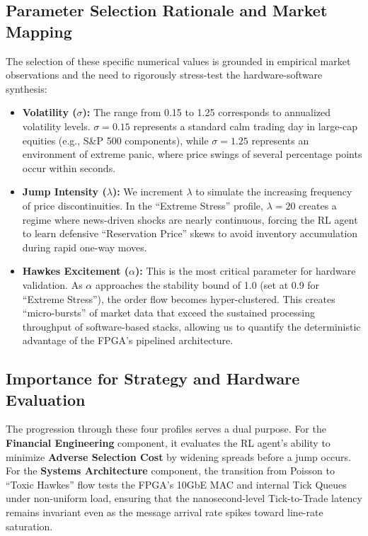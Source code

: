 \subsection{Parameter Selection Rationale and Market Mapping}
The selection of these specific numerical values is grounded in empirical market observations and the need to rigorously stress-test the hardware-software synthesis:

\begin{itemize}
    \item \textbf{Volatility ($\sigma$):} The range from 0.15 to 1.25 corresponds to annualized volatility levels. $\sigma=0.15$ represents a standard calm trading day in large-cap equities (e.g., S\&P 500 components), while $\sigma=1.25$ represents an environment of extreme panic, where price swings of several percentage points occur within seconds.
    \item \textbf{Jump Intensity ($\lambda$):} We increment $\lambda$ to simulate the increasing frequency of price discontinuities. In the ``Extreme Stress'' profile, $\lambda=20$ creates a regime where news-driven shocks are nearly continuous, forcing the RL agent to learn defensive ``Reservation Price'' skews to avoid inventory accumulation during rapid one-way moves.
    \item \textbf{Hawkes Excitement ($\alpha$):} This is the most critical parameter for hardware validation. As $\alpha$ approaches the stability bound of 1.0 (set at 0.9 for ``Extreme Stress''), the order flow becomes hyper-clustered. This creates ``micro-bursts'' of market data that exceed the sustained processing throughput of software-based stacks, allowing us to quantify the deterministic advantage of the FPGA's pipelined architecture.
\end{itemize}

\subsection{Importance for Strategy and Hardware Evaluation}
The progression through these four profiles serves a dual purpose. For the \textbf{Financial Engineering} component, it evaluates the RL agent's ability to minimize \textbf{Adverse Selection Cost} by widening spreads before a jump occurs. For the \textbf{Systems Architecture} component, the transition from Poisson to ``Toxic Hawkes'' flow tests the FPGA's 10GbE MAC and internal Tick Queues under non-uniform load, ensuring that the nanosecond-level Tick-to-Trade latency remains invariant even as the message arrival rate spikes toward line-rate saturation.

